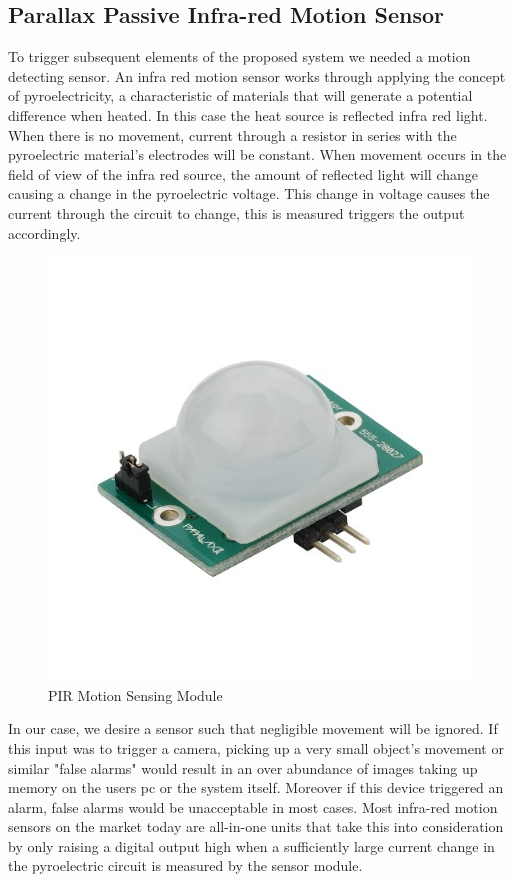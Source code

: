 \subsection{Parallax Passive Infra-red Motion Sensor}\cite{Webster}
\par To trigger subsequent elements of the proposed system we needed a motion detecting sensor. An infra red motion sensor works through applying the concept of pyroelectricity, a characteristic of materials that will generate a potential difference when heated. In this case the heat source is reflected infra red light. When there is no movement, current through a resistor in series with the pyroelectric material's electrodes will be constant. When movement occurs in the field of view of the infra red source, the amount of reflected light will change causing a change in the pyroelectric voltage. This change in voltage causes the current through the circuit to change, this is measured triggers the output accordingly.\cite{Webster}
\begin{figure}[h]
	\centering
	\includegraphics{pirDevice.jpg}
	\caption{PIR Motion Sensing Module}
\end{figure}
\newpage
\par In our case, we desire a sensor such that negligible movement will be ignored. If this input was to trigger a camera, picking up a very small object's movement or similar "false alarms" would result in an over abundance of images taking up memory on the users pc or the system itself. Moreover if this device triggered an alarm, false alarms would be unacceptable in most cases. Most infra-red motion sensors on the market today are all-in-one units that take this into consideration by only raising a digital output high when a sufficiently large current change in the pyroelectric circuit is measured by the sensor module. 
